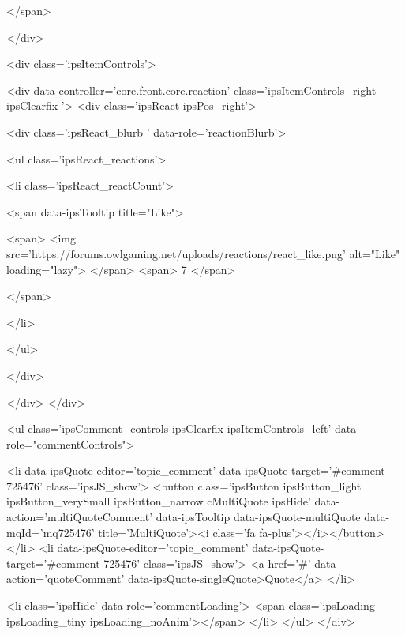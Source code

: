 	
</span>
			
		</div>

		
			<div class='ipsItemControls'>
				
					
						

	<div data-controller='core.front.core.reaction' class='ipsItemControls_right ipsClearfix '>	
		<div class='ipsReact ipsPos_right'>
			
				
				<div class='ipsReact_blurb ' data-role='reactionBlurb'>
					
						

	
	<ul class='ipsReact_reactions'>
		
		
			
				
				<li class='ipsReact_reactCount'>
					
						<span data-ipsTooltip title="Like">
					
							<span>
								<img src='https://forums.owlgaming.net/uploads/reactions/react_like.png' alt="Like" loading="lazy">
							</span>
							<span>
								7
							</span>
					
						</span>
					
				</li>
			
		
	</ul>

					
				</div>
			
			
			
		</div>
	</div>

					
				
				<ul class='ipsComment_controls ipsClearfix ipsItemControls_left' data-role="commentControls">
					
						
							<li data-ipsQuote-editor='topic_comment' data-ipsQuote-target='#comment-725476' class='ipsJS_show'>
								<button class='ipsButton ipsButton_light ipsButton_verySmall ipsButton_narrow cMultiQuote ipsHide' data-action='multiQuoteComment' data-ipsTooltip data-ipsQuote-multiQuote data-mqId='mq725476' title='MultiQuote'><i class='fa fa-plus'></i></button>
							</li>
							<li data-ipsQuote-editor='topic_comment' data-ipsQuote-target='#comment-725476' class='ipsJS_show'>
								<a href='#' data-action='quoteComment' data-ipsQuote-singleQuote>Quote</a>
							</li>
						
						
						
					
					<li class='ipsHide' data-role='commentLoading'>
						<span class='ipsLoading ipsLoading_tiny ipsLoading_noAnim'></span>
					</li>
				</ul>
			</div>
		

		
			


